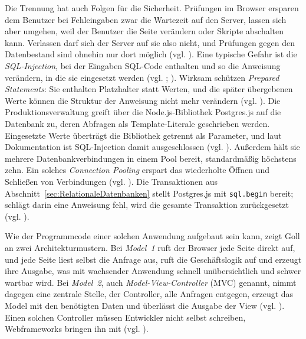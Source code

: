 Die Trennung hat auch Folgen für die Sicherheit. Prüfungen im Browser ersparen
dem Benutzer bei Fehleingaben zwar die Wartezeit auf den Server, lassen sich
aber umgehen, weil der Benutzer die Seite verändern oder Skripte abschalten
kann. Verlassen darf sich der Server auf sie also nicht, und Prüfungen gegen den
Datenbestand sind ohnehin nur dort möglich (vgl.
\cite[S.~203]{kudrassTaschenbuchDatenbankenImWeb}). Eine typische Gefahr ist die
\emph{SQL-Injection}, bei der Eingaben SQL-Code enthalten und so die Anweisung
verändern, in die sie eingesetzt werden (vgl.
\cite[S.~146\,f.]{kudrassTaschenbuchDatenbankenAnwendungsPro};
\cite[S.~204]{kudrassTaschenbuchDatenbankenImWeb}). Wirksam schützen
\emph{Prepared Statements}: Sie enthalten Platzhalter statt Werten, und die
später übergebenen Werte können die Struktur der Anweisung nicht mehr verändern
(vgl. \cite[S.~147]{kudrassTaschenbuchDatenbankenAnwendungsPro}). Die
Produktionsverwaltung greift über die Node.js-Bibliothek Postgres.js auf die
Datenbank zu, deren Abfragen als Template-Literale geschrieben werden.
Eingesetzte Werte überträgt die Bibliothek getrennt als Parameter, und laut
Dokumentation ist SQL-Injection damit ausgeschlossen (vgl.
\cite[Abschnitt \enquote{Queries}]{PorsagerPostgresPostgresjs}). Außerdem hält
sie mehrere Datenbankverbindungen in einem Pool bereit, standardmäßig höchstens
zehn. Ein solches \emph{Connection Pooling} erspart das wiederholte Öffnen und
Schließen von Verbindungen (vgl.
\cite[S.~162\,f.]{kudrassTaschenbuchDatenbankenAnwendungsPro}). Die
Transaktionen aus Abschnitt~\ref{sec:RelationaleDatenbanken} stellt
Postgres.js mit \texttt{sql.begin} bereit; schlägt darin eine Anweisung fehl,
wird die gesamte Transaktion zurückgesetzt (vgl.
\cite[Abschnitt \enquote{Transactions}]{PorsagerPostgresPostgresjs}).

Wie der Programmcode einer solchen Anwendung aufgebaut sein kann, zeigt Goll an
zwei Architekturmustern. Bei \emph{Model~1} ruft der Browser jede Seite direkt
auf, und jede Seite liest selbst die Anfrage aus, ruft die Geschäftslogik auf
und erzeugt ihre Ausgabe, was mit wachsender Anwendung schnell unübersichtlich
und schwer wartbar wird. Bei \emph{Model~2}, auch \emph{Model-View-Controller}
(MVC) genannt, nimmt dagegen eine zentrale Stelle, der Controller, alle Anfragen
entgegen, erzeugt das Model mit den benötigten Daten und überlässt die Ausgabe
der View (vgl. \cite[S.~10--13]{gollJavaServerFacesJSF2020}). Einen solchen
Controller müssen Entwickler nicht selbst schreiben, Webframeworks bringen ihn
mit (vgl. \cite[S.~14]{gollJavaServerFacesJSF2020}).

